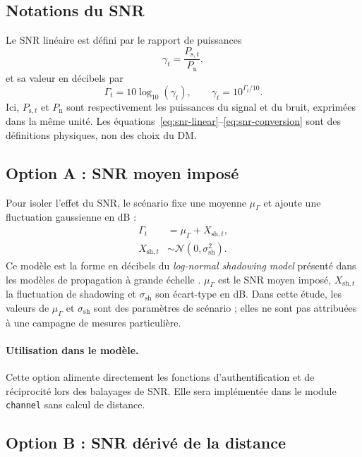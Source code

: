 \documentclass[conference,a4paper]{IEEEtran}
\begin{document}
\subsection{Notations du SNR}
Le SNR linéaire est défini par le rapport de puissances
\begin{equation}
    \gamma_t=\frac{P_{\mathrm{s},t}}{P_{\mathrm{n}}},
    \label{eq:snr-linear}
\end{equation}
et sa valeur en décibels par
\begin{equation}
    \Gamma_t=10\log_{10}(\gamma_t),
    \qquad
    \gamma_t=10^{\Gamma_t/10}.
    \label{eq:snr-conversion}
\end{equation}
Ici, $P_{\mathrm{s},t}$ et $P_{\mathrm{n}}$ sont respectivement les puissances du signal et du bruit, exprimées dans la même unité. Les équations~\eqref{eq:snr-linear}--\eqref{eq:snr-conversion} sont des définitions physiques, non des choix du DM.

\subsection{Option A : SNR moyen imposé}
Pour isoler l'effet du SNR, le scénario fixe une moyenne $\mu_\Gamma$ et ajoute une fluctuation gaussienne en dB :
\begin{align}
    \Gamma_t &= \mu_\Gamma+X_{\mathrm{sh},t},
    \label{eq:snr-imposed}\\
    X_{\mathrm{sh},t}&\sim\mathcal{N}(0,\sigma_{\mathrm{sh}}^2).
    \label{eq:shadowing-db}
\end{align}
Ce modèle est la forme en décibels du \emph{log-normal shadowing model} présenté dans les modèles de propagation à grande échelle \cite[Chap.~4]{rappaport2002}. $\mu_\Gamma$ est le SNR moyen imposé, $X_{\mathrm{sh},t}$ la fluctuation de shadowing et $\sigma_{\mathrm{sh}}$ son écart-type en dB. Dans cette étude, les valeurs de $\mu_\Gamma$ et $\sigma_{\mathrm{sh}}$ sont des paramètres de scénario ; elles ne sont pas attribuées à une campagne de mesures particulière.

\paragraph{Utilisation dans le modèle.}
Cette option alimente directement les fonctions d'authentification et de réciprocité lors des balayages de SNR. Elle sera implémentée dans le module \texttt{channel} sans calcul de distance.

\subsection{Option B : SNR dérivé de la distance}
\end{document}

